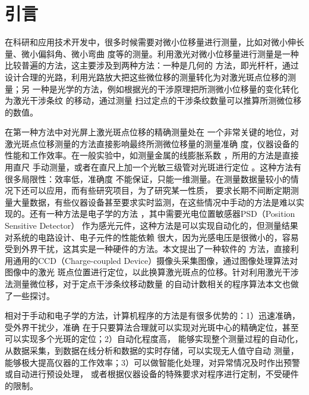 \documentclass[UTF8,a4paper,12pt]{article}
\begin{document}

\thispagestyle{plain}
\tableofcontents
\newpage
{}


\section{引言}
在科研和应用技术开发中，很多时候需要对微小位移量进行测量，比如对微小伸长量、微小偏斜角、微小弯曲
度等的测量。利用激光对微小位移量进行测量是一种比较普遍的方法，这主要涉及到两种方法：一种是几何的
方法，即光杆杆，通过设计合理的光路，利用光路放大把这些微位移的测量转化为对激光斑点位移的测量；另
一种是光学的方法，例如根据光的干涉原理把所测微小位移量的变化转化为激光干涉条纹
的移动\cite{jiguangganshe}，通过测量
扫过定点的干涉条纹数量可以推算所测微位移的数值。

在第一种方法中对光屏上激光斑点位移的精确测量处在
一个非常关键的地位，对激光斑点位移测量的方法直接影响最终所测微位移量的测量准确
度，仪器设备的性能和工作效率。在一般实验中，如测量金属的线膨胀系数\cite{xianpengzhang}
，所用的方法是直接用直尺
手动测量，或者在直尺上加一个光敏三级管对光斑进行定位\cite{guangdian}
。这种方法有很多局限性：效率低，准确度
不能保证，只能一维测量。在测量数据量较小的情况下还可以应用，而有些研究项目，为了研究某一性质，
要求长期不间断定期测量大量数据，有些仪器设备甚至要求实时监测，在这些情况中手动的方法是难以实现的。还有一种方法是电子学的方法\cite{xinhaochuli}
，其中需要光电位置敏感器PSD（Position Sensitive Detector）
作为感光元件，这种方法是可以实现自动化的，但测量结果对系统的电路设计、电子元件的性能依赖
很大，因为光感电压是很微小的，容易受到外界干扰，这其实是一种硬件的方法。本文提出了一种软件的
方法，直接利用通用的CCD（Charge-coupled Device）摄像头采集图像，通过图像处理算法对图像中的激光
斑点位置进行定位，以此换算激光斑点的位移。针对利用激光干涉法测量微位移，对于定点干涉条纹移动数量
的自动计数相关的程序算法本文也做了一些探讨。

相对于手动和电子学的方法，计算机程序的方法是有很多优势的：1）迅速准确，受外界干扰少，准确
在于只要算法合理就可以实现对光斑中心的精确定位，甚至可以实现多个光斑的定位；2）自动化程度高，
能够实现整个测量过程的自动化，从数据采集，到数据在线分析和数据的实时存储，可以实现无人值守自动
测量，能够极大提高仪器的工作效率；3）可以做智能化处理，对异常情况及时作出预警或自动进行预设处理，
或者根据仪器设备的特殊要求对程序进行定制，不受硬件的限制。
\end{document}
